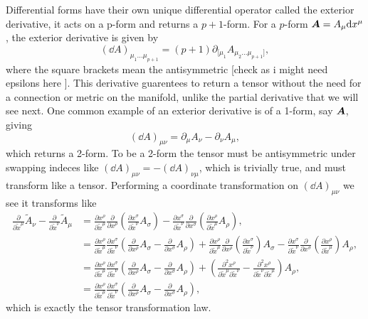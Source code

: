 Differential forms have their own unique differential operator called the exterior derivative, it acts on a p-form and returns a $p+1$-form. For a $p$-form $\boldsymbol{A} = A_\mu \dd x^\mu$, the exterior derivative is given by 
\begin{equation}
(\dd A)_{\mu_1 ... \mu_{p+1}} = (p+1)\partial_{[ \mu_1}A_{\mu_2 ... \mu_{p+1}]},
\end{equation}
where the square brackets mean the antisymmetric [check as i might need epsilons here ]. This derivative guarentees to return a tensor without the need for a connection or metric on the manifold, unlike the partial derivative that we will see next. One common example of an exterior derivative is of a 1-form, say $\boldsymbol{A}$, giving 
\begin{equation}
(\dd A)_{\mu\nu} = \partial_\mu A_\nu - \partial_\nu A_\mu,
\end{equation}
which returns a 2-form. To be a 2-form the tensor must be antisymmetric under swapping indeces like $(\dd A)_{\mu\nu} = -(\dd A)_{\nu\mu}$, which is trivially true, and must transform like a tensor. Performing a coordinate transformation on $(\dd A)_{\mu\nu}$ we see it transforms like 
\begin{align}
\frac{\partial}{\partial \tilde{x}^\mu}\tilde{A}_\nu - \frac{\partial}{\partial \tilde{x}^\nu} \tilde{A}_\mu &= 
\frac{\partial x^\rho}{\partial \tilde{x}^\mu}\frac{\partial}{\partial {x}^\rho}\left(\frac{\partial {x}^\sigma}{\partial\tilde{x}^\nu}A_\sigma\right) 
- \frac{\partial x^\sigma}{\partial \tilde{x}^\nu}\frac{\partial}{\partial {x}^\sigma}\left(\frac{\partial {x}^\rho}{\partial\tilde{x}^\mu}A_\rho\right) ,\\
&= \frac{\partial x^\rho}{\partial \tilde{x}^\mu}\frac{\partial {x}^\sigma}{\partial\tilde{x}^\nu}\left(\frac{\partial}{\partial {x}^\rho} A_\sigma - \frac{\partial}{\partial {x}^\sigma} A_\rho\right)
+ 
\frac{\partial x^\rho}{\partial \tilde{x}^\mu}\frac{\partial}{\partial {x}^\rho}\left(\frac{\partial {x}^\sigma}{\partial\tilde{x}^\nu}\right) A_\sigma
- \frac{\partial x^\sigma}{\partial \tilde{x}^\nu}\frac{\partial}{\partial {x}^\sigma}\left(\frac{\partial {x}^\rho}{\partial\tilde{x}^\mu}\right)A_\rho ,\\
&= \frac{\partial x^\rho}{\partial \tilde{x}^\mu}\frac{\partial {x}^\sigma}{\partial\tilde{x}^\nu}\left(\frac{\partial}{\partial {x}^\rho} A_\sigma - \frac{\partial}{\partial {x}^\sigma} A_\rho\right)
+ 
\left(  \frac{\partial^2 {x}^\rho}{\partial \tilde{x}^\mu\partial\tilde{x}^\nu} 
- \frac{\partial^2 {x}^\rho}{\partial\tilde{x}^\nu\partial\tilde{x}^\mu} \right)A_\rho ,\\
&= \frac{\partial x^\rho}{\partial \tilde{x}^\mu}\frac{\partial {x}^\sigma}{\partial\tilde{x}^\nu}\left(\frac{\partial}{\partial {x}^\rho} A_\sigma - \frac{\partial}{\partial {x}^\sigma} A_\rho\right),
\end{align}
which is exactly the tensor transformation law.

